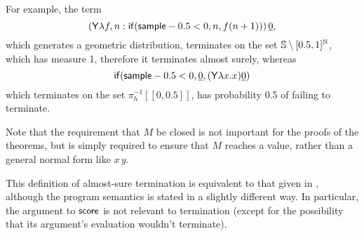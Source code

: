 \iffalse
\lo{Alternatively, define the \emph{runtime of $M$} to be the random variable 
\[
T_M(s) := 
\begin{cases}
\min \set{n \mid \pi_0(\red^n(M, s)) \textrm{ is a value}} & \hbox{if $\red^\infty(M,s)$ is defined}\\
\infty & \hbox{otherwise}
\end{cases}
\]
Equivalently, we say that $M$ is \emph{almost-surely terminating} (AST) if $T_M < \infty$ a.s.; 
and $M$ is \emph{positively almost-surely terminating} (PAST) if $\expect{T_M} < \infty$.}
\fi
For example, the term 
\[
(\mathsf{Y} \lambda f, n: \mathsf{if}(\mathsf{sample} - 0.5 < 0, n, f (n+1)) ) \, \underline{0},
\] 
which generates a geometric distribution, terminates on the set ${\mathbb{S}} \setminus [0.5,1]^\mathbb N$, which has measure 1, therefore it terminates almost surely, whereas 
\[
\mathsf{if}(\mathsf{sample} - 0.5 < 0, \underline 0, (\mathsf{Y} \lambda x. x) \underline 0)
\] 
which terminates on the set $\pi_h^{-1}[[0,0.5]]$, has probability 0.5 of failing to terminate.

Note that the requirement that $M$ be closed is not important for the proofs of the theorems, but is simply required to ensure that $M$ reaches a value, rather than a general normal form like $x \, y$.

This definition of almost-sure termination is equivalent to that given in \citep{MakOPW21}, although the program semantics is stated in a slightly different way. In particular, the argument to $\tscore$ is not relevant to termination (except for the possibility that its argument's evaluation wouldn't terminate).

\iffalse
\lo{Your operational semantics does not maintain a record of the current weight of the reduction.
A.s.~termination does depend on $\tscore$: see \cite[\S 4.3]{MakOPW21}\footnote{\url{https://arxiv.org/abs/2004.03924}}.
I think it important to take the behaviour of $\tscore$ into account;
you should do it as a future task.}
\fi
